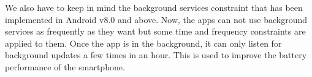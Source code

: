 We also have to keep in mind the background services constraint that has been implemented in Android v8.0 and above. Now, the apps can not use background services as frequently as they want but some time and frequency constraints are applied to them. Once the app is in the background, it can only listen for background updates a few times in an hour. This is used to improve the battery performance of the smartphone. 







